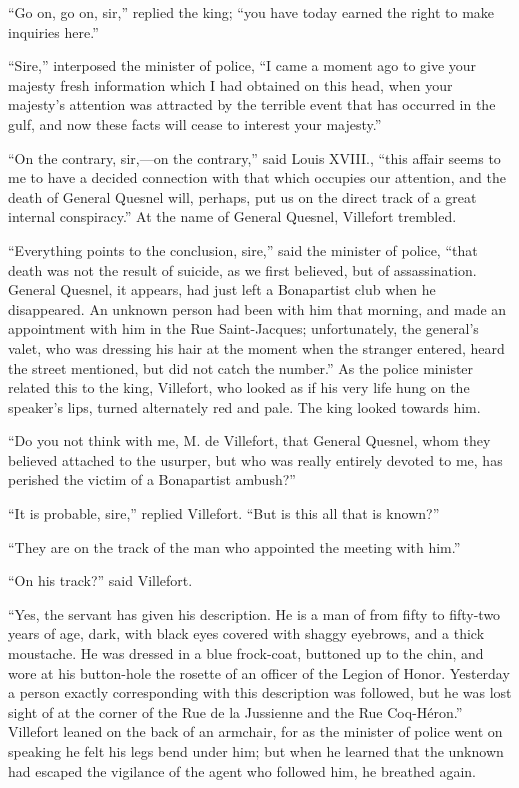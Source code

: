 “Go on, go on, sir,” replied the king; “you have today earned the right
to make inquiries here.”

“Sire,” interposed the minister of police, “I came a moment ago to give
your majesty fresh information which I had obtained on this head, when
your majesty’s attention was attracted by the terrible event that has
occurred in the gulf, and now these facts will cease to interest your
majesty.”

“On the contrary, sir,—on the contrary,” said Louis XVIII., “this
affair seems to me to have a decided connection with that which
occupies our attention, and the death of General Quesnel will, perhaps,
put us on the direct track of a great internal conspiracy.” At the name
of General Quesnel, Villefort trembled.

“Everything points to the conclusion, sire,” said the minister of
police, “that death was not the result of suicide, as we first
believed, but of assassination. General Quesnel, it appears, had just
left a Bonapartist club when he disappeared. An unknown person had been
with him that morning, and made an appointment with him in the Rue
Saint-Jacques; unfortunately, the general’s valet, who was dressing his
hair at the moment when the stranger entered, heard the street
mentioned, but did not catch the number.” As the police minister
related this to the king, Villefort, who looked as if his very life
hung on the speaker’s lips, turned alternately red and pale. The king
looked towards him.

“Do you not think with me, M. de Villefort, that General Quesnel, whom
they believed attached to the usurper, but who was really entirely
devoted to me, has perished the victim of a Bonapartist ambush?”

“It is probable, sire,” replied Villefort. “But is this all that is
known?”

“They are on the track of the man who appointed the meeting with him.”

“On his track?” said Villefort.

“Yes, the servant has given his description. He is a man of from fifty
to fifty-two years of age, dark, with black eyes covered with shaggy
eyebrows, and a thick moustache. He was dressed in a blue frock-coat,
buttoned up to the chin, and wore at his button-hole the rosette of an
officer of the Legion of Honor. Yesterday a person exactly
corresponding with this description was followed, but he was lost sight
of at the corner of the Rue de la Jussienne and the Rue Coq-Héron.”
Villefort leaned on the back of an armchair, for as the minister of
police went on speaking he felt his legs bend under him; but when he
learned that the unknown had escaped the vigilance of the agent who
followed him, he breathed again.

